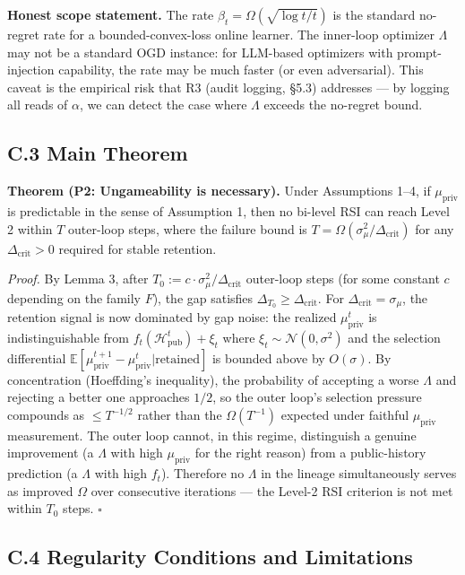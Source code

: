 \documentclass{article}
\theoremstyle{definition}
\begin{document}
\textbf{Honest scope statement.} The rate $\beta_t = \Omega(\sqrt{\log t / t})$ is the standard no-regret rate for a bounded-convex-loss online learner. The inner-loop optimizer $\Lambda$ may not be a standard OGD instance: for LLM-based optimizers with prompt-injection capability, the rate may be much faster (or even adversarial). This caveat is the empirical risk that R3 (audit logging, \S5.3) addresses --- by logging all reads of $\alpha$, we can detect the case where $\Lambda$ exceeds the no-regret bound.

\subsection*{C.3 Main Theorem}

\textbf{Theorem (P2: Ungameability is necessary).} Under Assumptions 1--4, if $\mu_{\text{priv}}$ is predictable in the sense of Assumption 1, then no bi-level RSI can reach Level 2 within $T$ outer-loop steps, where the failure bound is $T = \Omega(\sigma_\mu^2 / \Delta_{\text{crit}})$ for any $\Delta_{\text{crit}} > 0$ required for stable retention.

\textit{Proof.} By Lemma 3, after $T_0 := c \cdot \sigma_\mu^2 / \Delta_{\text{crit}}$ outer-loop steps (for some constant $c$ depending on the family $F$), the gap satisfies $\Delta_{T_0} \geq \Delta_{\text{crit}}$. For $\Delta_{\text{crit}} = \sigma_\mu$, the retention signal is now dominated by gap noise: the realized $\mu_{\text{priv}}^t$ is indistinguishable from $f_t(\mathcal{H}_{\text{pub}}^t) + \xi_t$ where $\xi_t \sim \mathcal{N}(0, \sigma^2)$ and the selection differential $\mathbb{E}[\mu_{\text{priv}}^{t+1} - \mu_{\text{priv}}^t | \text{retained}]$ is bounded above by $O(\sigma)$. By concentration (Hoeffding's inequality), the probability of accepting a worse $\Lambda$ and rejecting a better one approaches $1/2$, so the outer loop's selection pressure compounds as $\le T^{-1/2}$ rather than the $\Omega(T^{-1})$ expected under faithful $\mu_{\text{priv}}$ measurement. The outer loop cannot, in this regime, distinguish a genuine improvement (a $\Lambda$ with high $\mu_{\text{priv}}$ for the right reason) from a public-history prediction (a $\Lambda$ with high $f_t$). Therefore no $\Lambda$ in the lineage simultaneously serves as improved $\Omega$ over consecutive iterations --- the Level-2 RSI criterion is not met within $T_0$ steps. \hfill$\square$

\subsection*{C.4 Regularity Conditions and Limitations}
\end{document}
